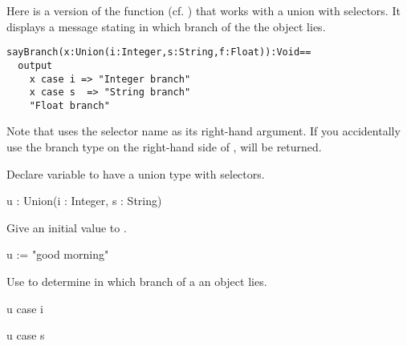 Here is a version of the  function (cf.
) that works with a union with selectors.
It displays a message stating in which branch of the  the
object lies.
\begin{verbatim}
sayBranch(x:Union(i:Integer,s:String,f:Float)):Void==
  output
    x case i => "Integer branch"
    x case s  => "String branch"
    "Float branch"
\end{verbatim}
Note that  uses the selector name as its right-hand argument.
If you accidentally use the branch type on the right-hand side of
,  will be returned.

\begin{xtc}
\begin{xtccomment}
Declare variable  to have a union type with selectors.
\end{xtccomment}
\begin{spadsrc}
u : Union(i : Integer, s : String) 
\end{spadsrc}
\end{xtc}
\begin{xtc}
\begin{xtccomment}
Give an initial value to .
\end{xtccomment}
\begin{spadsrc}
u := "good morning" 
\end{spadsrc}
\begin{TeXOutput}
\begin{fricasmath}{2}
%
\end{fricasmath}
\end{TeXOutput}
\end{xtc}
\begin{xtc}
\begin{xtccomment}
Use  to determine in which
branch of a  an object lies.
\end{xtccomment}
\begin{spadsrc}
u case i 
\end{spadsrc}
\begin{TeXOutput}
\begin{fricasmath}{3}
%
\end{fricasmath}
\end{TeXOutput}
\end{xtc}
\begin{xtc}
\begin{xtccomment}
\end{xtccomment}
\begin{spadsrc}
u case s 
\end{spadsrc}
\begin{TeXOutput}
\begin{fricasmath}{4}
%
\end{fricasmath}
\end{TeXOutput}
\end{xtc}
